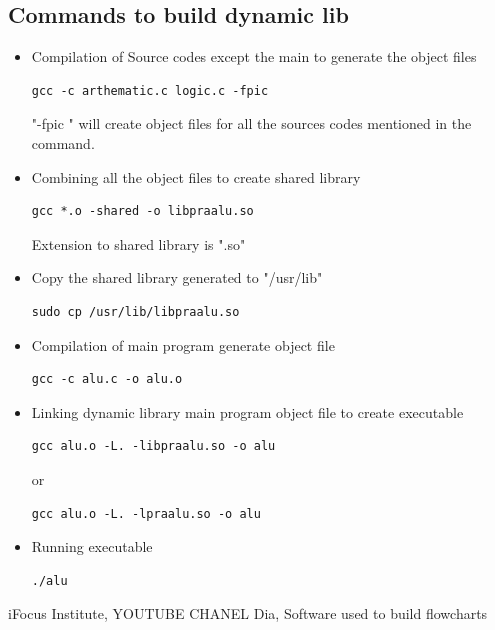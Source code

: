 \documentclass[conference]{IEEEtran}
\begin{document}
\subsection*{Commands to build dynamic lib}
\begin{itemize}
\item Compilation of Source codes except the main to generate the object files
\begin{lstlisting}
gcc -c arthematic.c logic.c -fpic
\end{lstlisting}
"-fpic " will create object files for all the sources codes mentioned in the command.
\item Combining all the object files to create shared library
\begin{lstlisting}
gcc *.o -shared -o libpraalu.so
\end{lstlisting}
Extension to shared library is ".so"
\item Copy the shared library generated to "/usr/lib"
\begin{lstlisting}
sudo cp /usr/lib/libpraalu.so
\end{lstlisting}
\item Compilation of main program generate object file
\begin{lstlisting}
gcc -c alu.c -o alu.o
\end{lstlisting}
\item Linking dynamic library main program object file to create executable 
\begin{lstlisting}
gcc alu.o -L. -libpraalu.so -o alu
\end{lstlisting}

 or
 
\begin{lstlisting}
gcc alu.o -L. -lpraalu.so -o alu
\end{lstlisting}
\item Running executable
\begin{lstlisting}
./alu
\end{lstlisting}
\end{itemize}

\begin{thebibliography}{00}
 iFocus Institute, YOUTUBE CHANEL
 Dia, Software used to build flowcharts 


\end{thebibliography}
\end{document}
